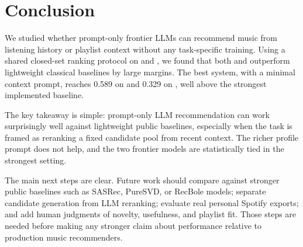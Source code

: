 \section{Conclusion}
\label{sec:conclusion}

We studied whether prompt-only frontier LLMs can recommend music from listening history or playlist context without any task-specific training. Using a shared closed-set ranking protocol on \lastfm and \mpd, we found that both \gptfourone and \claudesonnet outperform lightweight classical baselines by large margins. The best system, \gptfourone with a minimal context prompt, reaches 0.589 \mrr on \lastfm and 0.329 \mrr on \mpd, well above the strongest implemented baseline.

The key takeaway is simple: prompt-only LLM recommendation can work surprisingly well against lightweight public baselines, especially when the task is framed as reranking a fixed candidate pool from recent context. The richer profile prompt does not help, and the two frontier models are statistically tied in the strongest setting.

The main next steps are clear. Future work should compare against stronger public baselines such as SASRec, PureSVD, or RecBole models; separate candidate generation from LLM reranking; evaluate real personal Spotify exports; and add human judgments of novelty, usefulness, and playlist fit. Those steps are needed before making any stronger claim about performance relative to production music recommenders.
